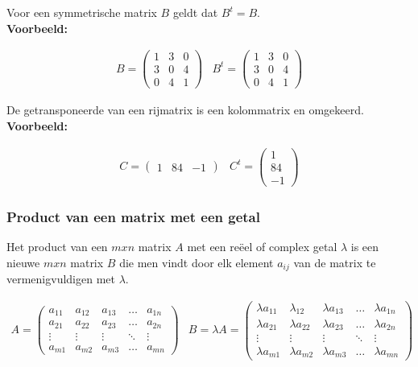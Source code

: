 Voor een symmetrische matrix $B$ geldt dat $B^t =B$.\\

{\bf Voorbeeld:}

\[ \begin{array}{ll}
B= \left( \begin{matrix}
1 & 3 & 0  \\
3 & 0 & 4  \\
0 & 4 & 1 
\end{matrix} \right) &
B^t = \left( \begin{matrix}
1 & 3 & 0  \\
3 & 0 & 4  \\
0 & 4 & 1 
\end{matrix}
\right)
\end{array}
\]

De getransponeerde van een rijmatrix is een kolommatrix en omgekeerd.\\

{\bf Voorbeeld:}

\[ \begin{array}{ll}
C= \left( \begin{matrix}
1 & 84 & -1  
\end{matrix} \right) &
C^t = \left( \begin{matrix}
1 \\
84 \\
-1
\end{matrix}
\right)
\end{array}
\]


\subsubsection{Product van een matrix met een getal}
	
Het product van een $mxn$ matrix $A$ met een re\"{e}el of complex getal $\lambda$ is een nieuwe $mxn$ matrix $B$ die men vindt door elk element $a_{ij}$ van de matrix te vermenigvuldigen met $\lambda$.
	
\[
\begin{array}{ll}
A= \left( \begin{matrix}
a_{11} & a_{12} & a_{13} & \ldots & a_{1n} \\
a_{21} & a_{22} & a_{23} & \ldots & a_{2n} \\
\vdots & \vdots & \vdots & \ddots & \vdots \\
a_{m1} & a_{m2} & a_{m3} & \ldots & a_{mn}
\end{matrix} \right) &
B=\lambda A=\left( \begin{matrix}
\lambda a_{11} & \lambda_{12} & \lambda a_{13} & \ldots & \lambda a_{1n} \\
\lambda a_{21} & \lambda a_{22} & \lambda a_{23} & \ldots & \lambda a_{2n} \\
\vdots & \vdots & \vdots & \ddots & \vdots \\
\lambda a_{m1} & \lambda a_{m2} & \lambda a_{m3} & \ldots & \lambda a_{mn}
\end{matrix} \right)
\end{array}
\]
	
